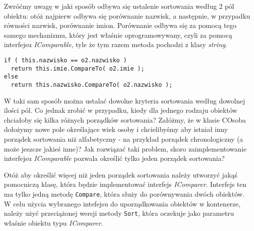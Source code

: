 Zwróćmy uwagę w jaki sposób odbywa się ustalenie sortowania według 2 pól obiektu: otóż najpierw odbywa się
porównanie nazwisk, a następnie, w przypadku równości nazwisk, porównanie imion. Porównanie odbywa się
za pomocą tego samego mechanizmu, który jest właśnie oprogramowywany, czyli za pomocą interfejsu {\em IComparable},
tyle że tym razem metoda pochodzi z klasy {\em string}.

\begin{scriptsize}
\begin{verbatim}
if ( this.nazwisko == o2.nazwisko )
  return this.imie.CompareTo( o2.imie );
else
  return this.nazwisko.CompareTo( o2.nazwisko );
\end{verbatim}
\end{scriptsize}

W taki sam sposób można ustalać dowolne kryteria sortowania według dowolnej ilości pól. Co jednak zrobić
w przypadku, kiedy dla jednego rodzaju obiektów chciałoby się kilka różnych porządków sortowania?
Załóżmy, że w klasie COsoba dołożymy nowe pole określające wiek osoby i chcielibyśmy aby istniał 
inny porządek sortowania niż alfabetyczny - na przykład porządek chronologiczny (a może jeszcze jakieś inne)? 
Jak rozwiązać taki problem, skoro zaimplementowanie interfejsu {\em IComparable} pozwala określić tylko jeden
porządek sortowania?

Otóż aby określić więcej niż jeden porządek sortowania należy utworzyć jakąś pomocniczą klasę, która
będzie implementować interfejs {\em IComparer}. Interfejs ten ma tylko jedną metodę {\tt Compare}, która
służy do porównywania dwóch obiektów. W celu użycia wybranego intefejsu do uporządkowania obiektów
w kontenerze, należy użyć przeciążonej wersji metody {\tt Sort}, która oczekuje jako parametru właśnie
obiektu typu {\em IComparer}.

